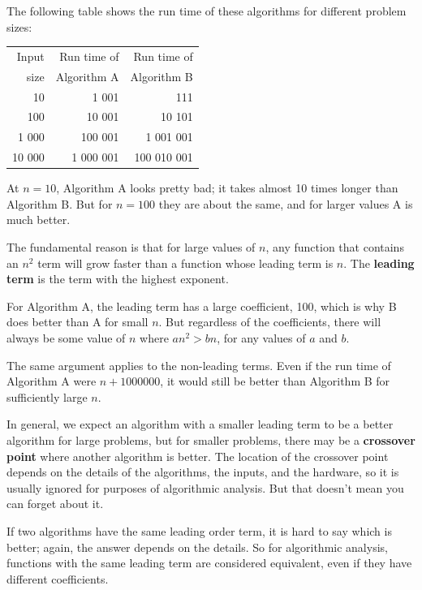 \documentclass[10pt]{book}
\begin{document}
The following table shows the run time of these algorithms
for different problem sizes:

\begin{tabular}{|r|r|r|}
\hline
Input     &   Run time of     & Run time of \\
size      &   Algorithm A     & Algorithm B \\
\hline
10        &   1 001           & 111         \\
100       &   10 001          & 10 101         \\
1 000     &   100 001         & 1 001 001         \\
10 000    &   1 000 001       & 100 010 001         \\
\hline
\end{tabular}

At $n=10$, Algorithm A looks pretty bad; it takes almost 10 times
longer than Algorithm B.  But for $n=100$ they are about the same, and
for larger values A is much better.

The fundamental reason is that for large values of $n$, any function
that contains an $n^2$ term will grow faster than a function whose
leading term is $n$.  The {\bf leading term} is the term with the
highest exponent.

For Algorithm A, the leading term has a large coefficient, 100, which
is why B does better than A for small $n$.  But regardless of the
coefficients, there will always be some value of $n$ where
$a n^2 > b n$, for any values of $a$ and $b$.

The same argument applies to the non-leading terms.  Even if the run
time of Algorithm A were $n+1000000$, it would still be better than
Algorithm B for sufficiently large $n$.

In general, we expect an algorithm with a smaller leading term to be a
better algorithm for large problems, but for smaller problems, there
may be a {\bf crossover point} where another algorithm is better.  The
location of the crossover point depends on the details of the
algorithms, the inputs, and the hardware, so it is usually ignored for
purposes of algorithmic analysis.  But that doesn't mean you can forget
about it.

If two algorithms have the same leading order term, it is hard to say
which is better; again, the answer depends on the details.  So for
algorithmic analysis, functions with the same leading term
are considered equivalent, even if they have different coefficients.
\end{document}
